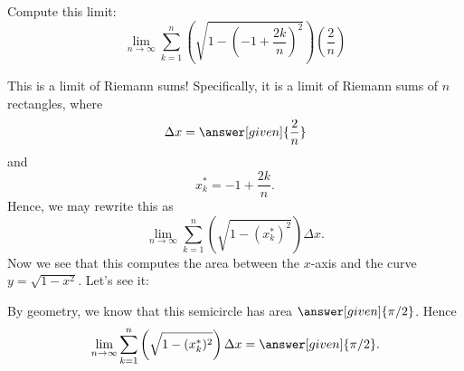 \documentclass{ximera}
\begin{document}
\begin{example}
  Compute this limit:
  \[
  \lim_{n\to \infty} \sum_{k=1}^n \left(\sqrt{1-\left(-1+\frac{2k}{n}\right)^2}\right)
  \left(\frac{2}{n}\right)
  \]
  \begin{explanation}
    This is a limit of Riemann sums!  Specifically, it is a limit of
    Riemann sums of $n$ rectangles, where
    \[
    \Delta x = \answer[given]{\frac{2}{n}}
    \]
    and
    \[
    x_k^* = -1+\frac{2k}{n}.
    \]
    Hence, we may rewrite this as
    \[
    \lim_{n\to \infty} \sum_{k=1}^n \left(\sqrt{1-(x_k^*)^2}\right)
    \Delta x.
    \]
    Now we see that this computes the area between the $x$-axis and
    the curve $y = \sqrt{1-x^2}$. Let's see it:
    \begin{image}
    \end{image}
    By geometry, we know that this semicircle has area $\answer[given]{\pi/2}$. Hence
    \[
    \lim_{n\to \infty} \sum_{k=1}^n \left(\sqrt{1-(x_k^*)^2}\right)\Delta x =\answer[given]{\pi/2}.
    \]
  \end{explanation}
\end{example}
\end{document}
